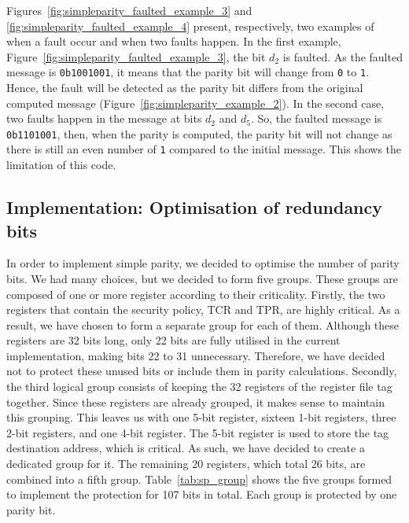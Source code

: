 Figures~\ref{fig:simpleparity_faulted_example_3} and \ref{fig:simpleparity_faulted_example_4} present, respectively, two examples of when a fault occur and when two faults happen.
In the first example, Figure~\ref{fig:simpleparity_faulted_example_3}, the bit $d_2$ is faulted. As the faulted message is \texttt{0b1001001}, it means that the parity bit will change from \texttt{0} to \texttt{1}. Hence, the fault will be detected as the parity bit differs from the original computed message (Figure~\ref{fig:simpleparity_example_2}).
In the second case, two faults happen in the message at bits $d_2$ and $d_5$. So, the faulted message is \texttt{0b1101001}, then, when the parity is computed, the parity bit will not change as there is still an even number of \texttt{1} compared to the initial message. This shows the limitation of this code.

\subsection{Implementation: Optimisation of redundancy bits}

In order to implement simple parity, we decided to optimise the number of parity bits. We had many choices, but we decided to form five groups. These groups are composed of one or more register according to their criticality.
Firstly, the two registers that contain the security policy, TCR and TPR, are highly critical. As a result, we have chosen to form a separate group for each of them. Although these registers are 32 bits long, only 22 bits are fully utilised in the current implementation, making bits 22 to 31 unnecessary. Therefore, we have decided not to protect these unused bits or include them in parity calculations.
Secondly, the third logical group consists of keeping the 32 registers of the register file tag together. Since these registers are already grouped, it makes sense to maintain this grouping.
This leaves us with one 5-bit register, sixteen 1-bit registers, three 2-bit registers, and one 4-bit register. The 5-bit register is used to store the tag destination address, which is critical. As such, we have decided to create a dedicated group for it. The remaining 20 registers, which total 26 bits, are combined into a fifth group.
Table~\ref{tab:sp_group} shows the five groups formed to implement the protection for 107 bits in total. Each group is protected by one parity bit.

